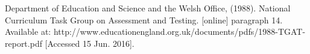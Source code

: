 \begin{thebibliography}{9}

    Department of Education and Science and the Welsh Office, (1988).
    National Curriculum Task Group on Assessment and Testing.
    [online]
    paragraph 14.
    Available at: http://www.educationengland.org.uk/documents/pdfs/1988-TGAT-report.pdf
    [Accessed 15 Jun. 2016].

\end{thebibliography}
